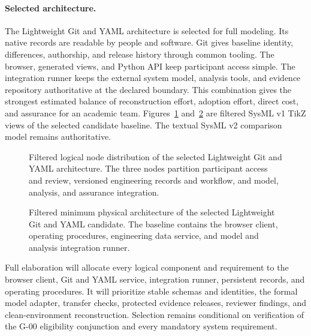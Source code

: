\documentclass[11pt,a4paper]{article}
\begin{document}
\paragraph{Selected architecture.}
The Lightweight Git and YAML architecture is selected for full modeling. Its native records are readable by people and software. Git gives baseline identity, differences, authorship, and release history through common tooling. The browser, generated views, and Python API keep participant access simple. The integration runner keeps the external system model, analysis tools, and evidence repository authoritative at the declared boundary. This combination gives the strongest estimated balance of reconstruction effort, adoption effort, direct cost, and assurance for an academic team. Figures~\ref{fig:git-yaml-logical-nodes} and~\ref{fig:git-yaml-physical-architecture} are filtered SysML v1 TikZ views of the selected candidate baseline. The textual SysML v2 comparison model remains authoritative.

\begin{figure}[H]
    \centering
    \resizebox{\linewidth}{!}{}
    \caption{Filtered logical node distribution of the selected Lightweight Git and YAML architecture. The three nodes partition participant access and review, versioned engineering records and workflow, and model, analysis, and assurance integration.}
    \label{fig:git-yaml-logical-nodes}
\end{figure}

\begin{figure}[H]
    \centering
    \resizebox{\linewidth}{!}{}
    \caption{Filtered minimum physical architecture of the selected Lightweight Git and YAML candidate. The baseline contains the browser client, operating procedures, engineering data service, and model and analysis integration runner.}
    \label{fig:git-yaml-physical-architecture}
\end{figure}

Full elaboration will allocate every logical component and requirement to the browser client, Git and YAML service, integration runner, persistent records, and operating procedures. It will prioritize stable schemas and identities, the formal model adapter, transfer checks, protected evidence releases, reviewer findings, and clean-environment reconstruction. Selection remains conditional on verification of the G-00 eligibility conjunction and every mandatory system requirement.
\end{document}
